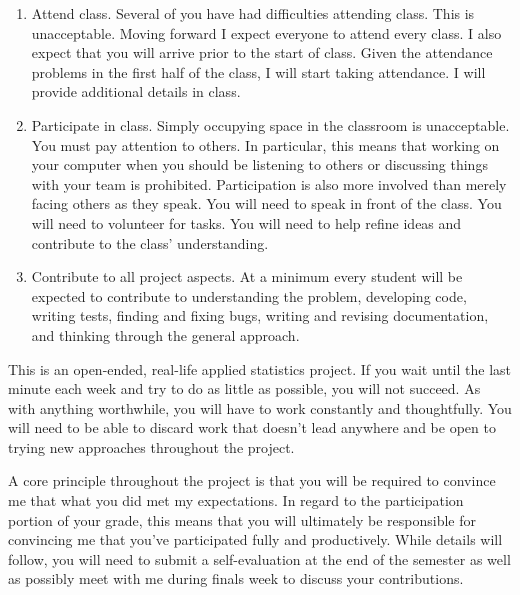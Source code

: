 \documentclass[11pt, oneside]{article}   	%
\begin{document}
\begin{enumerate}
\item Attend class.  Several of you have had difficulties attending class.
  This is unacceptable.  Moving forward I expect everyone to attend every
  class.  I also expect that you will arrive prior to the start of class.
  Given the attendance problems in the first half of the class, I will
  start taking attendance.  I will provide additional details in class.
\item Participate in class.  Simply occupying space in the classroom is
  unacceptable.  You must pay attention to others.  In particular, this
  means that working on your computer when you should be listening to
  others or discussing things with your team is prohibited.  Participation
  is also more involved than merely facing others as they speak.  You will need
  to speak in front of the class.  You will need to volunteer for tasks.
  You will need to help refine ideas and contribute to the class' understanding. 
\item Contribute to all project aspects.  At a minimum every student will
  be expected to contribute to understanding the problem, developing code,
  writing tests, finding and fixing bugs, writing and revising documentation, and
  thinking through the general approach.
\end{enumerate}

This is an open-ended, real-life applied statistics project.  If you wait until
the last minute each week and try to do as little as possible, you will not
succeed.  As with anything worthwhile, you will have to work constantly and
thoughtfully.  You will need to be able to discard work that doesn't lead
anywhere and be open to trying new approaches throughout the project.

A core principle throughout the project is that you will be required to
convince me that what you did met my expectations.  In regard to the
participation portion of your grade, this means that you will ultimately be
responsible for convincing me that you've participated fully and productively.
While details will follow, you will need to submit a self-evaluation at the end
of the semester as well as possibly meet with me during finals week to discuss
your contributions.
\end{document}
